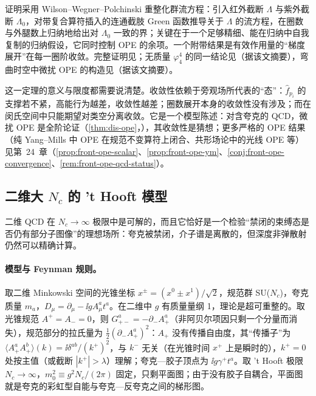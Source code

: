 \begin{proofsketch}
证明\cite{Hollands:2011gf}采用 Wilson--Wegner--Polchinski 重整化群流方程：引入红外截断 $\Lambda$ 与紫外截断 $\Lambda_0$，对带复合算符插入的连通截肢 Green 函数推导关于 $\Lambda$ 的流方程，在圈数与外腿数上归纳地给出对 $\Lambda_0$ 一致的界；关键在于一个足够精细、能在归纳中自我复制的归纳假设，它同时控制 OPE 的余项。一个附带结果是有效作用量的“梯度展开”在每一圈阶收敛。完整证明见\cite[定理~3 及其证明]{Hollands:2011gf}；无质量 $\varphi^4_4$ 的同一结论见\cite{Holland:2014pna}（据该文摘要），弯曲时空中微扰 OPE 的构造见\cite{Hollands:2006ag}（据该文摘要）。
\end{proofsketch}

这一定理的意义与限度都需要说清楚。收敛性依赖于旁观场所代表的“态”：$\hat f_{p_i}$ 的支撑若不紧，高能行为越差，收敛性越差；圈数展开本身的收敛性没有涉及；而在闵氏空间中只能期望对类空分离收敛\cite{Hollands:2011gf}。它是一个模型陈述：对含夸克的 QCD，微扰 OPE 是全阶论证（\cref{thm:dis-ope}，\tagA），其收敛性是猜想；更多严格的 OPE 结果（纯 Yang--Mills 中 OPE 在规范不变算符上闭合、共形场论中的光线 OPE 等）见第~24~章（\cref{prop:front-ope-scalar}、\cref{prop:front-ope-ym}、\cref{conj:front-ope-convergence}、\cref{rem:front-ope-qcd-status}）。

\subsection{二维大 \texorpdfstring{$N_c$}{Nc} 的 't Hooft 模型}

二维 QCD 在 $N_c\to\infty$ 极限中是可解的\cite{tHooft1974}，而且它恰好是一个检验“禁闭的束缚态是否仍有部分子图像”的理想场所：夸克被禁闭，介子谱是离散的，但深度非弹散射仍然可以精确计算。

\paragraph{模型与 Feynman 规则。}
取二维 Minkowski 空间的光锥坐标 $x^\pm=(x^0\pm x^1)/\sqrt2$，规范群 SU($N_c$)，夸克质量 $m_a$，$D_\mu=\partial_\mu-\ii gA^a_\mu t^a$。在二维中 $g$ 有质量量纲 1，理论是超可重整的。取光锥规范 $A^+=A_-=0$，则 $G^a_{+-}=-\partial_-A^a_+$（非阿贝尔项因只剩一个分量而消失），规范部分的拉氏量为 $\frac12(\partial_-A^a_+)^2$：$A_+$ 没有传播自由度，其“传播子”为 $\langle A^a_+A^b_+\rangle(k)=\ii\delta^{ab}/(k^+)^2$，与 $k^-$ 无关（在光锥时间 $x^+$ 上是瞬时的），$k^+=0$ 处按主值（或截断 $|k^+|>\lambda$）理解；夸克—胶子顶点为 $\ii g\gamma^+t^a$。取 't Hooft 极限 $N_c\to\infty$，$m_0^2\equiv g^2N_c/(2\pi)$ 固定，只剩平面图；由于没有胶子自耦合，平面图就是夸克的彩虹型自能与夸克—反夸克之间的梯形图。

